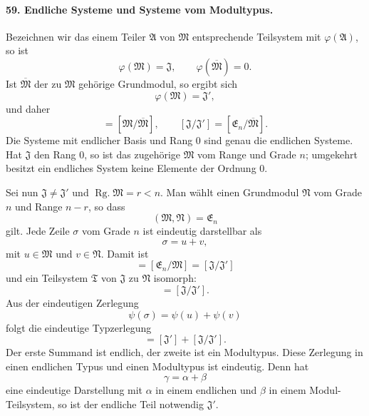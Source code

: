 \documentclass[11pt]{article}
\newcommand{\Rg}{\operatorname{Rg.}}
\begin{document}
\paragraph{59. Endliche Systeme und Systeme vom Modultypus.}
Bezeichnen wir das einem Teiler $\mathfrak A$ von $\mathfrak M$ entsprechende Teilsystem mit $\varphi(\mathfrak A)$, so ist
\begin{equation}
  \varphi(\mathfrak M)=\mathfrak J,
  \qquad
  \varphi(\overline{\mathfrak M})=0.
\tag{96}
\end{equation}
Ist $\overline{\mathfrak M}$ der zu $\mathfrak M$ gehörige Grundmodul, so ergibt sich
\begin{equation}
  \varphi(\mathfrak M)=\mathfrak J',
\tag{97}
\end{equation}
und daher
\begin{equation}
  [\mathfrak J']=[\mathfrak M/\overline{\mathfrak M}],
  \qquad
  [\mathfrak J/\mathfrak J']=[\mathfrak E_n/\overline{\mathfrak M}].
\tag{98}
\end{equation}
Die Systeme mit endlicher Basis und Rang $0$ sind genau die endlichen Systeme. Hat $\mathfrak J$ den Rang $0$, so ist das zugehörige $\mathfrak M$ vom Range und Grade $n$; umgekehrt besitzt ein endliches System keine Elemente der Ordnung $0$.

Sei nun $\mathfrak J\ne\mathfrak J'$ und $\Rg\mathfrak M=r<n$. Man wählt einen Grundmodul $\mathfrak N$ vom Grade $n$ und Range $n-r$, so dass
\begin{equation}
  (\mathfrak M,\mathfrak N)=\mathfrak E_n
\tag{99}
\end{equation}
gilt. Jede Zeile $\sigma$ vom Grade $n$ ist eindeutig darstellbar als
\begin{equation}
  \sigma=u+v,
\tag{100}
\end{equation}
mit $u\in\mathfrak M$ und $v\in\mathfrak N$. Damit ist
\begin{equation}
  [\mathfrak N]=[\mathfrak E_n/\mathfrak M]=[\mathfrak J/\mathfrak J']
\tag{101}
\end{equation}
und ein Teilsystem $\mathfrak T$ von $\mathfrak J$ zu $\mathfrak N$ isomorph:
\begin{equation}
  [\mathfrak T]=[\mathfrak J/\mathfrak J'].
\tag{102}
\end{equation}
Aus der eindeutigen Zerlegung
\begin{equation}
  \psi(\sigma)=\psi(u)+\psi(v)
\tag{103}
\end{equation}
folgt die eindeutige Typzerlegung
\begin{equation}
  [\mathfrak J]=[\mathfrak J']+[\mathfrak J/\mathfrak J'].
\tag{104}
\end{equation}
Der erste Summand ist endlich, der zweite ist ein Modultypus. Diese Zerlegung in einen endlichen Typus und einen Modultypus ist eindeutig. Denn hat
\begin{equation}
  \gamma=\alpha+\beta
\tag{105}
\end{equation}
eine eindeutige Darstellung mit $\alpha$ in einem endlichen und $\beta$ in einem Modul-Teilsystem, so ist der endliche Teil notwendig $\mathfrak J'$.
\end{document}
